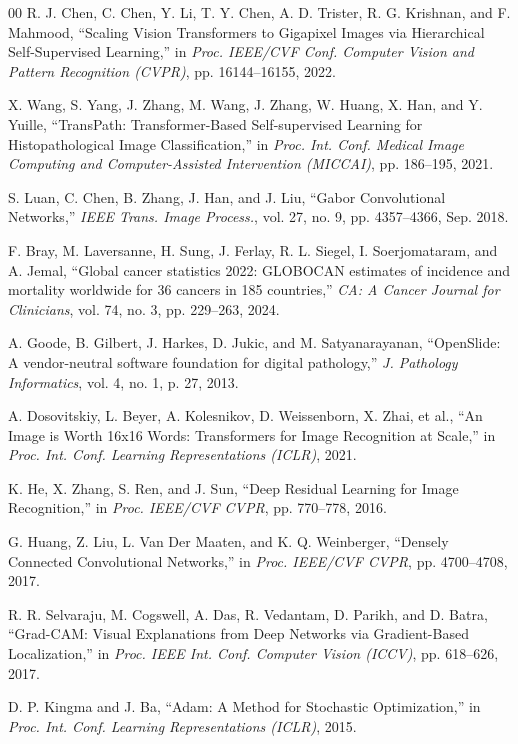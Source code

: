 \documentclass[conference]{IEEEtran}
\begin{document}
\begin{thebibliography}{00}
 R. J. Chen, C. Chen, Y. Li, T. Y. Chen, A. D. Trister, R. G. Krishnan, and F. Mahmood, ``Scaling Vision Transformers to Gigapixel Images via Hierarchical Self-Supervised Learning,'' in \emph{Proc. IEEE/CVF Conf. Computer Vision and Pattern Recognition (CVPR)}, pp. 16144--16155, 2022.

 X. Wang, S. Yang, J. Zhang, M. Wang, J. Zhang, W. Huang, X. Han, and Y. Yuille, ``TransPath: Transformer-Based Self-supervised Learning for Histopathological Image Classification,'' in \emph{Proc. Int. Conf. Medical Image Computing and Computer-Assisted Intervention (MICCAI)}, pp. 186--195, 2021.

 S. Luan, C. Chen, B. Zhang, J. Han, and J. Liu, ``Gabor Convolutional Networks,'' \emph{IEEE Trans. Image Process.}, vol. 27, no. 9, pp. 4357--4366, Sep. 2018.

 F. Bray, M. Laversanne, H. Sung, J. Ferlay, R. L. Siegel, I. Soerjomataram, and A. Jemal, ``Global cancer statistics 2022: GLOBOCAN estimates of incidence and mortality worldwide for 36 cancers in 185 countries,'' \emph{CA: A Cancer Journal for Clinicians}, vol. 74, no. 3, pp. 229--263, 2024.

 A. Goode, B. Gilbert, J. Harkes, D. Jukic, and M. Satyanarayanan, ``OpenSlide: A vendor-neutral software foundation for digital pathology,'' \emph{J. Pathology Informatics}, vol. 4, no. 1, p. 27, 2013.

 A. Dosovitskiy, L. Beyer, A. Kolesnikov, D. Weissenborn, X. Zhai, et al., ``An Image is Worth 16x16 Words: Transformers for Image Recognition at Scale,'' in \emph{Proc. Int. Conf. Learning Representations (ICLR)}, 2021.

 K. He, X. Zhang, S. Ren, and J. Sun, ``Deep Residual Learning for Image Recognition,'' in \emph{Proc. IEEE/CVF CVPR}, pp. 770--778, 2016.

 G. Huang, Z. Liu, L. Van Der Maaten, and K. Q. Weinberger, ``Densely Connected Convolutional Networks,'' in \emph{Proc. IEEE/CVF CVPR}, pp. 4700--4708, 2017.

 R. R. Selvaraju, M. Cogswell, A. Das, R. Vedantam, D. Parikh, and D. Batra, ``Grad-CAM: Visual Explanations from Deep Networks via Gradient-Based Localization,'' in \emph{Proc. IEEE Int. Conf. Computer Vision (ICCV)}, pp. 618--626, 2017.

 D. P. Kingma and J. Ba, ``Adam: A Method for Stochastic Optimization,'' in \emph{Proc. Int. Conf. Learning Representations (ICLR)}, 2015.
\end{thebibliography}
\end{document}
